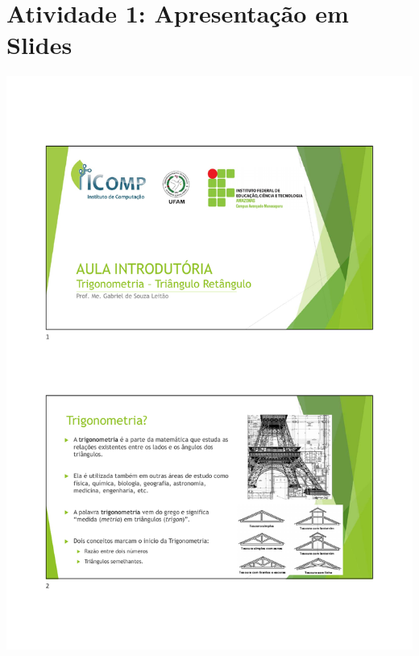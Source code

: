 \section{Atividade 1: Apresentação em Slides}\label{section:atividade1_slides}
\includegraphics[width=\textwidth]{chapters/appendixLesson/Aula1Base20220611.pdf}
%

